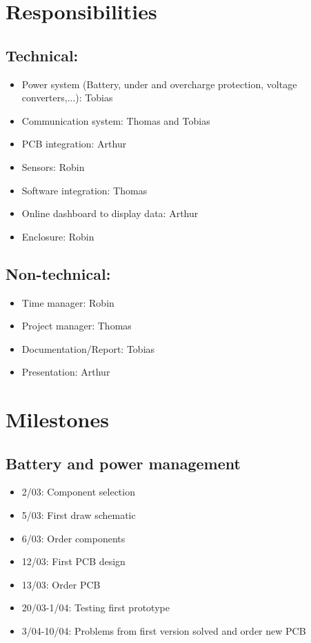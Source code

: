 \documentclass[]{article}
\begin{document}
	\section{Responsibilities}
	\subsection{Technical:}
	\begin{itemize}
		\item Power system (Battery, under and overcharge protection, voltage converters,...): Tobias
		\item Communication system: Thomas and Tobias
		\item PCB integration: Arthur
		\item Sensors: Robin
		\item Software integration: Thomas
		\item Online dashboard to display data: Arthur
		\item Enclosure: Robin
	\end{itemize}

	\subsection{Non-technical: }
	\begin{itemize}
		\item Time manager: Robin
		\item Project manager: Thomas
		\item Documentation/Report: Tobias
		\item Presentation: Arthur
	\end{itemize}

	\section{Milestones}
	\subsection{Battery and power management}
	\begin{itemize}
		\item 2/03: Component selection
		\item 5/03: First draw schematic
		\item 6/03: Order components
		\item 12/03: First PCB design
		\item 13/03: Order PCB
		\item 20/03-1/04: Testing first prototype
		\item 3/04-10/04: Problems from first version solved and order new PCB 
	\end{itemize}
\end{document}
